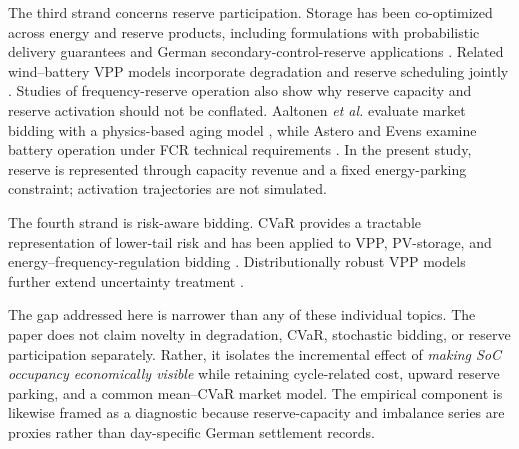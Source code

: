 \documentclass[journal,12pt,twocolumn]{IEEEtran}
\begin{document}
The third strand concerns reserve participation. Storage has been co-optimized across energy and reserve products, including formulations with probabilistic delivery guarantees and German secondary-control-reserve applications \cite{Toubeau2021,Merten2020a,Merten2020b,Fernandez2023}. Related wind--battery VPP models incorporate degradation and reserve scheduling jointly \cite{Fernandez2023,Ghanaee2024}. Studies of frequency-reserve operation also show why reserve capacity and reserve activation should not be conflated. Aaltonen \emph{et al.} evaluate market bidding with a physics-based aging model \cite{Aaltonen2022}, while Astero and Evens examine battery operation under FCR technical requirements \cite{Astero2020}. In the present study, reserve is represented through capacity revenue and a fixed energy-parking constraint; activation trajectories are not simulated.

The fourth strand is risk-aware bidding. CVaR provides a tractable representation of lower-tail risk \cite{Artzner1999,Rockafellar2000,Rockafellar2002} and has been applied to VPP, PV-storage, and energy--frequency-regulation bidding \cite{Vahedipour2021,Wang2026,Onsomu2025}. Distributionally robust VPP models further extend uncertainty treatment \cite{Gao2023}.

The gap addressed here is narrower than any of these individual topics. The paper does not claim novelty in degradation, CVaR, stochastic bidding, or reserve participation separately. Rather, it isolates the incremental effect of \emph{making SoC occupancy economically visible} while retaining cycle-related cost, upward reserve parking, and a common mean--CVaR market model. The empirical component is likewise framed as a diagnostic because reserve-capacity and imbalance series are proxies rather than day-specific German settlement records.
\end{document}

